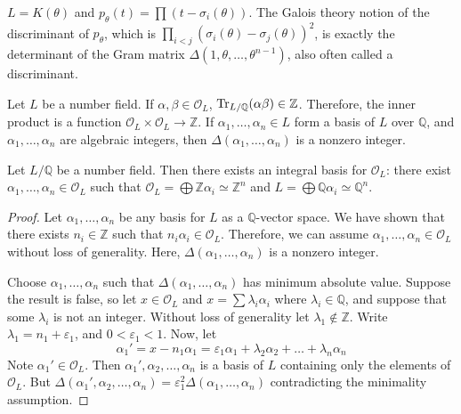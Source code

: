 \begin{remark}
    \( L = K(\theta) \) and \( p_\theta(t) = \prod (t-\sigma_i(\theta)) \).
    The Galois theory notion of the discriminant of \( p_\theta \), which is \( \prod_{i < j} (\sigma_i(\theta) - \sigma_j(\theta))^2 \), is exactly the determinant of the Gram matrix \( \Delta(1, \theta, \dots, \theta^{n-1}) \), also often called a discriminant.
\end{remark}
\begin{remark}
    Let \( L \) be a number field.
    If \( \alpha, \beta \in \mathcal O_L \), \( \Tr_{L/\mathbb Q}(\alpha\beta) \in \mathbb Z \).
    Therefore, the inner product is a function \( \mathcal O_L \times \mathcal O_L \to \mathbb Z \).
    If \( \alpha_1, \dots, \alpha_n \in L \) form a basis of \( L \) over \( \mathbb Q \), and \( \alpha_1, \dots, \alpha_n \) are algebraic integers, then \( \Delta(\alpha_1, \dots, \alpha_n) \) is a nonzero integer.
\end{remark}
\begin{theorem}
    Let \( L / \mathbb Q \) be a number field.
    Then there exists an integral basis for \( \mathcal O_L \): there exist \( \alpha_1, \dots, \alpha_n \in \mathcal O_L \) such that \( \mathcal O_L = \bigoplus \mathbb Z \alpha_i \simeq \mathbb Z^n \) and \( L = \bigoplus \mathbb Q \alpha_i \simeq \mathbb Q^n \).
\end{theorem}
\begin{proof}
    Let \( \alpha_1, \dots, \alpha_n \) be any basis for \( L \) as a \( \mathbb Q \)-vector space.
    We have shown that there exists \( n_i \in \mathbb Z \) such that \( n_i \alpha_i \in \mathcal O_L \).
    Therefore, we can assume \( \alpha_1, \dots, \alpha_n \in \mathcal O_L \) without loss of generality.
    Here, \( \Delta(\alpha_1, \dots, \alpha_n) \) is a nonzero integer.

    Choose \( \alpha_1, \dots, \alpha_n \) such that \( \Delta(\alpha_1, \dots, \alpha_n) \) has minimum absolute value.
    Suppose the result is false, so let \( x \in \mathcal O_L \) and \( x = \sum \lambda_i \alpha_i \) where \( \lambda_i \in \mathbb Q \), and suppose that some \( \lambda_i \) is not an integer.
    Without loss of generality let \( \lambda_1 \not\in \mathbb Z \).
    Write \( \lambda_1 = n_1 + \varepsilon_1 \), and \( 0 < \varepsilon_1 < 1 \).
    Now, let
    \[ \alpha_1' = x - n_1 \alpha_1 = \varepsilon_1 \alpha_1 + \lambda_2 \alpha_2 + \dots + \lambda_n \alpha_n \]
    Note \( \alpha_1' \in \mathcal O_L \).
    Then \( \alpha_1', \alpha_2, \dots, \alpha_n \) is a basis of \( L \) containing only the elements of \( \mathcal O_L \).
    But \( \Delta(\alpha_1', \alpha_2, \dots, \alpha_n) = \varepsilon_1^2 \Delta(\alpha_1, \dots, \alpha_n) \) contradicting the minimality assumption.
\end{proof}
